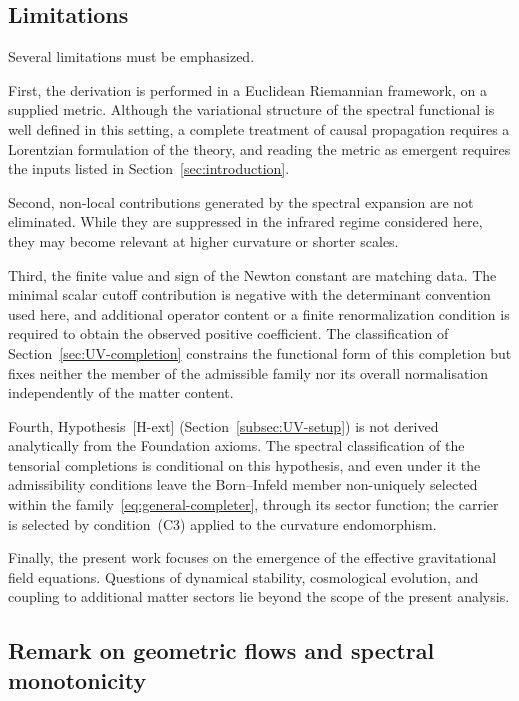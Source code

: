 \documentclass[pdflatex,sn-mathphys-num]{sn-jnl} %
\theoremstyle{remark}
\theoremstyle{plain}
\begin{document}
  \subsection{Limitations}
    \label{subsec:limitations}

    Several limitations must be emphasized.

    First, the derivation is performed in a Euclidean Riemannian framework, on a supplied metric.
    Although the variational structure of the spectral functional is well defined
    in this setting, a complete treatment of causal propagation requires a
    Lorentzian formulation of the theory, and reading the metric as emergent requires the inputs listed in
    Section~\ref{sec:introduction}.

    Second, non-local contributions generated by the spectral expansion are not
    eliminated.
    While they are suppressed in the infrared regime considered here,
    they may become relevant at higher curvature or shorter scales.

    Third, the finite value and sign of the Newton constant are matching data.
    The minimal scalar cutoff contribution is negative with the determinant convention used here, and additional
    operator content or a finite renormalization condition is required to obtain the observed positive coefficient.
    The classification of Section~\ref{sec:UV-completion} constrains the
    functional form of this completion but fixes neither the member of the
    admissible family nor its overall normalisation independently of the
    matter content.

    Fourth, Hypothesis~[H-ext]
    (Section~\ref{subsec:UV-setup}) is not
    derived analytically from the Foundation axioms.
    The spectral classification of the tensorial completions is conditional
    on this hypothesis, and even under it the admissibility conditions leave
    the Born--Infeld member non-uniquely selected within the
    family~\eqref{eq:general-completer}, through its sector function; the carrier is selected by condition~(C3)
    applied to the curvature endomorphism.

    Finally, the present work focuses on the emergence of the effective
    gravitational field equations.
    Questions of dynamical stability, cosmological evolution, and coupling to
    additional matter sectors lie beyond the scope of the present analysis.

  \subsection{Remark on geometric flows and spectral monotonicity}
    \label{subsec:ricci-flow}
\end{document}
